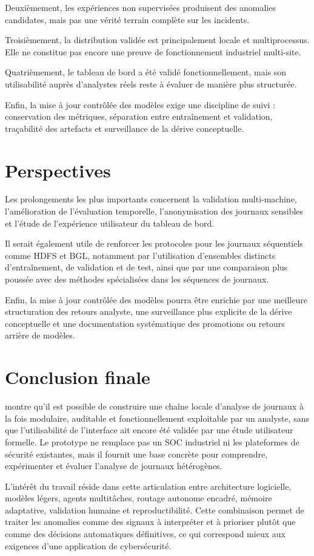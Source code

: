 Deuxièmement, les expériences non supervisées produisent des anomalies candidates, mais pas une vérité terrain complète sur les incidents.

Troisièmement, la distribution validée est principalement locale et multiprocessus. Elle ne constitue pas encore une preuve de fonctionnement industriel multi-site.

Quatrièmement, le tableau de bord a été validé fonctionnellement, mais son utilisabilité auprès d'analystes réels reste à évaluer de manière plus structurée.

Enfin, la mise à jour contrôlée des modèles exige une discipline de suivi : conservation des métriques, séparation entre entraînement et validation, traçabilité des artefacts et surveillance de la dérive conceptuelle.

\section{Perspectives}

Les prolongements les plus importants concernent la validation multi-machine, l'amélioration de l'évaluation temporelle, l'anonymisation des journaux sensibles et l'étude de l'expérience utilisateur du tableau de bord.

Il serait également utile de renforcer les protocoles pour les journaux séquentiels comme HDFS et BGL, notamment par l'utilisation d'ensembles distincts d'entraînement, de validation et de test, ainsi que par une comparaison plus poussée avec des méthodes spécialisées dans les séquences de journaux.

Enfin, la mise à jour contrôlée des modèles pourra être enrichie par une meilleure structuration des retours analyste, une surveillance plus explicite de la dérive conceptuelle et une documentation systématique des promotions ou retours arrière de modèles.

\section{Conclusion finale}

\logminer{} montre qu'il est possible de construire une chaîne locale d'analyse de journaux à la fois modulaire, auditable et fonctionnellement exploitable par un analyste, sans que l'utilisabilité de l'interface ait encore été validée par une étude utilisateur formelle. Le prototype ne remplace pas un SOC industriel ni les plateformes de sécurité existantes, mais il fournit une base concrète pour comprendre, expérimenter et évaluer l'analyse de journaux hétérogènes.

L'intérêt du travail réside dans cette articulation entre architecture logicielle, modèles légers, agents multitâches, routage autonome encadré, mémoire adaptative, validation humaine et reproductibilité. Cette combinaison permet de traiter les anomalies comme des signaux à interpréter et à prioriser plutôt que comme des décisions automatiques définitives, ce qui correspond mieux aux exigences d'une application de cybersécurité.
